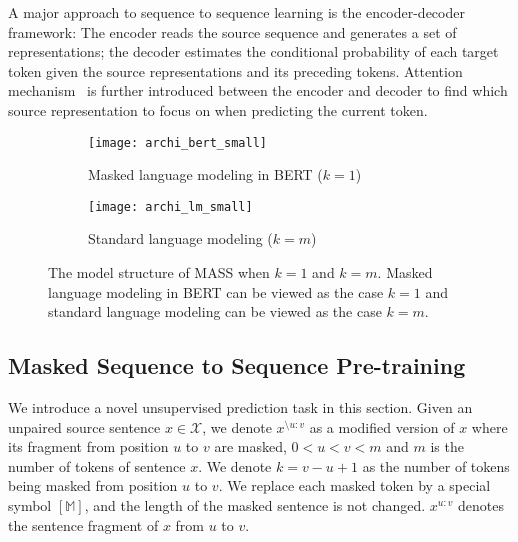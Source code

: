 \documentclass{article}
\begin{document}
	A major approach to sequence to sequence learning is the encoder-decoder framework: The encoder reads the source sequence and generates a set of representations; the decoder estimates the conditional probability of each target token given the source representations and its preceding tokens. Attention mechanism~\citep{DBLP:journals/corr/BahdanauCB14} is further introduced between the encoder and decoder to find which source representation to focus on when predicting the current token.
	
	\begin{figure*}[!t]
		\small
		\centering
		\begin{subfigure}{0.47\textwidth} \texttt{[image: archi\_bert\_small]}
			\caption{Masked language modeling in BERT ($k=1$)} \label{like_bert}
		\end{subfigure}
\begin{subfigure}{0.47\textwidth} \texttt{[image: archi\_lm\_small]}
			\caption{Standard language modeling ($k=m$)} \label{like_lm}
		\end{subfigure}
		\vspace{-0.2cm}
		\caption{The model structure of MASS when $k=1$ and $k=m$. Masked language modeling in BERT can be viewed as the case $k=1$ and standard language modeling can be viewed as the case $k=m$.} 
		\label{fig_mass_cover}
	\end{figure*}
	
	
	\subsection{Masked Sequence to Sequence Pre-training}
	\label{sec_mask_seq2seq}
	We introduce a novel unsupervised prediction task in this section. Given an unpaired source sentence $x \in \mathcal{X}$, we denote $x^{\setminus u:v}$ as a modified version of $x$ where its fragment from position $u$ to $v$ are masked, $0<u<v<m$ and $m$ is the number of tokens of sentence $x$. We denote $k=v-u+1$ as the number of tokens being masked from position $u$ to $v$. We replace each masked token by a special symbol $[\mathbb{M}]$, and the length of the masked sentence is not changed. $x^{u:v}$ denotes the sentence fragment of $x$ from $u$ to $v$.
	
\end{document}
